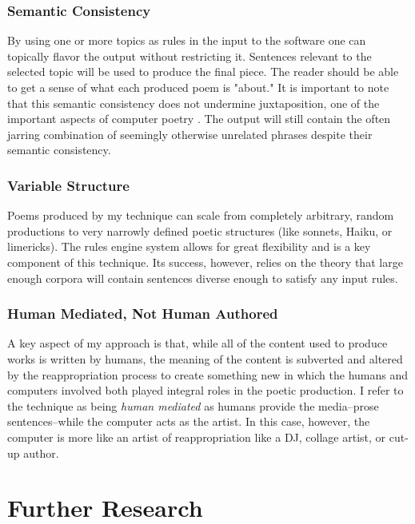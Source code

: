 \documentclass[10pt]{article}
\begin{document}
\subsubsection{Semantic Consistency}
By using one or more topics as rules in the input to the software one can
topically flavor the output without restricting it. Sentences relevant to the
selected topic will be used to produce the final piece. The reader should be
able to get a sense of what each produced poem is "about." It is important to
note that this semantic consistency does not undermine juxtaposition, one of
the important aspects of computer poetry \cite{Hart96}. The output will still
contain the often jarring combination of seemingly otherwise unrelated phrases
despite their semantic consistency.

\subsubsection{Variable Structure}
Poems produced by my technique can scale from completely arbitrary, random
productions to very narrowly defined poetic structures (like sonnets, Haiku, or
limericks). The rules engine system allows for great flexibility and is a key
component of this technique. Its success, however, relies on the theory that
large enough corpora will contain sentences diverse enough to satisfy any input
rules.

\subsubsection{Human Mediated, Not Human Authored}
A key aspect of my approach is that, while all of the content used to produce
works is written by humans, the meaning of the content is subverted and altered
by the reappropriation process to create something new in which the humans and
computers involved both played integral roles in the poetic production. I refer
to the technique as being \emph{human mediated} as humans provide the
media--prose sentences--while the computer acts as the artist. In this case,
however, the computer is more like an artist of reappropriation like a DJ,
collage artist, or cut-up author.

\section{Further Research}



\end{document}
